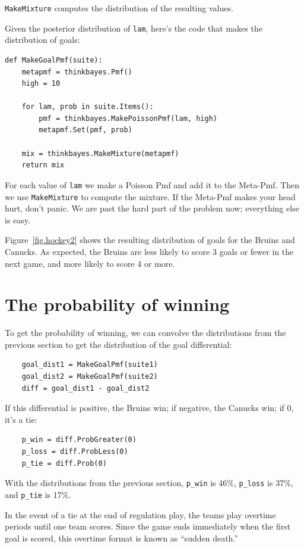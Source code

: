 \documentclass[12pt]{book}
\begin{document}
\verb"MakeMixture" computes the distribution of the resulting
values.

Given the posterior distribution of {\tt lam}, here's the code
that makes the distribution of goals:

\begin{verbatim}
def MakeGoalPmf(suite):
    metapmf = thinkbayes.Pmf()
    high = 10

    for lam, prob in suite.Items():
        pmf = thinkbayes.MakePoissonPmf(lam, high)
        metapmf.Set(pmf, prob)

    mix = thinkbayes.MakeMixture(metapmf)
    return mix
\end{verbatim}  

For each value of {\tt lam} we make a Poisson Pmf and add it to the
Meta-Pmf.  Then we use \verb"MakeMixture" to compute the mixture.  If
the Meta-Pmf makes your head hurt, don't panic.  We are past the hard
part of the problem now; everything else is easy.

Figure~\ref{fig.hockey2} shows the resulting distribution of goals for
the Bruins and Canucks.  As expected, the Bruins are less likely to
score 3 goals or fewer in the next game, and more likely to score 4 or
more.

\section{The probability of winning}

To get the probability of winning, we can convolve the distributions
from the previous section to get the distribution of the goal
differential:

\begin{verbatim}
    goal_dist1 = MakeGoalPmf(suite1)
    goal_dist2 = MakeGoalPmf(suite2)
    diff = goal_dist1 - goal_dist2
\end{verbatim}  

If this differential is positive, the Bruins win; if negative,
the Canucks win; if 0, it's a tie:

\begin{verbatim}
    p_win = diff.ProbGreater(0)
    p_loss = diff.ProbLess(0)
    p_tie = diff.Prob(0)
\end{verbatim}  

With the distributions from the previous section, \verb"p_win"
is 46\%, \verb"p_loss" is 37\%, and \verb"p_tie" is 17\%.

In the event of a tie at the end of regulation play, the teams play
overtime periods until one team scores.  Since the game ends
immediately when the first goal is scored, this overtime format
is known as ``sudden death.''
\end{document}
